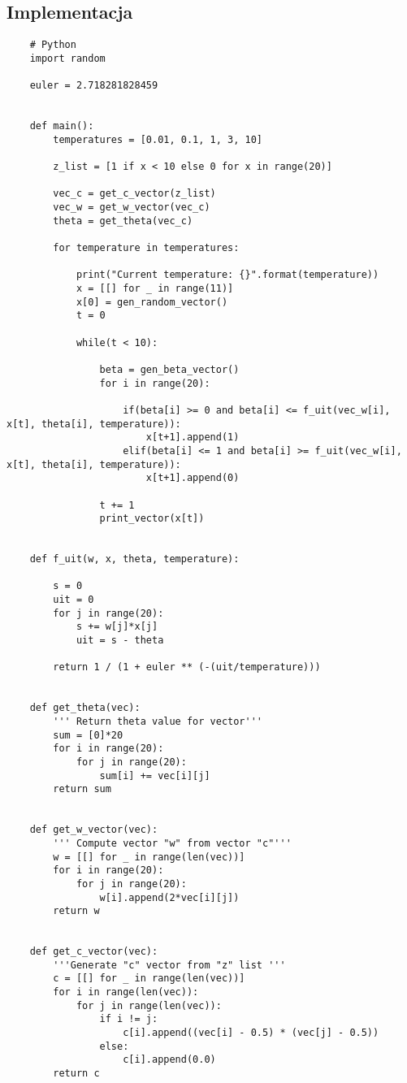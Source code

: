 \documentclass[11pt]{article}
\begin{document}
\subsection{Implementacja}
\begin{lstlisting}
    # Python
    import random
    
    euler = 2.718281828459
    
    
    def main():
        temperatures = [0.01, 0.1, 1, 3, 10]
    
        z_list = [1 if x < 10 else 0 for x in range(20)]
    
        vec_c = get_c_vector(z_list)
        vec_w = get_w_vector(vec_c)
        theta = get_theta(vec_c)
    
        for temperature in temperatures:
    
            print("Current temperature: {}".format(temperature))
            x = [[] for _ in range(11)]
            x[0] = gen_random_vector()
            t = 0
    
            while(t < 10):
    
                beta = gen_beta_vector()
                for i in range(20):
    
                    if(beta[i] >= 0 and beta[i] <= f_uit(vec_w[i], x[t], theta[i], temperature)):
                        x[t+1].append(1)
                    elif(beta[i] <= 1 and beta[i] >= f_uit(vec_w[i], x[t], theta[i], temperature)):
                        x[t+1].append(0)
    
                t += 1
                print_vector(x[t])
    
    
    def f_uit(w, x, theta, temperature):
    
        s = 0
        uit = 0
        for j in range(20):
            s += w[j]*x[j]
            uit = s - theta
    
        return 1 / (1 + euler ** (-(uit/temperature)))
    
    
    def get_theta(vec):
        ''' Return theta value for vector'''
        sum = [0]*20
        for i in range(20):
            for j in range(20):
                sum[i] += vec[i][j]
        return sum
    
    
    def get_w_vector(vec):
        ''' Compute vector "w" from vector "c"'''
        w = [[] for _ in range(len(vec))]
        for i in range(20):
            for j in range(20):
                w[i].append(2*vec[i][j])
        return w
    
    
    def get_c_vector(vec):
        '''Generate "c" vector from "z" list '''
        c = [[] for _ in range(len(vec))]
        for i in range(len(vec)):
            for j in range(len(vec)):
                if i != j:
                    c[i].append((vec[i] - 0.5) * (vec[j] - 0.5))
                else:
                    c[i].append(0.0)
        return c
    

\end{lstlisting}
\end{document}
